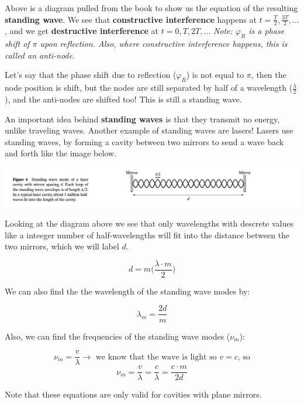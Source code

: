 \documentclass[10pt]{article}
\begin{document}
Above is a diagram pulled from the book to show us the equation of the resulting \textbf{standing wave}. We see that \textbf{constructive interference} happens at $t = \frac{T}{2}, \frac{3T}{2}, \dots$, and we get \textbf{destructive interference} at $t = 0, T, 2T, \dots$ \textit{Note: $\varphi_R$ is a phase shift of $\pi$ upon reflection. Also, where constructive interference happens, this is called an anti-node.}

\newblock

Let's say that the phase shift due to reflection ($\varphi_R$) is not equal to $\pi$, then the node position is shift, but the nodes are still separated by half of a wavelength ($\frac{\lambda}{2}$), and the anti-nodes are shifted too! This is still a standing wave.

\newblock

An important idea behind \textbf{standing waves} is that they transmit no energy, unlike traveling waves. Another example of standing waves are lasers! Lasers use standing waves, by forming a cavity between two mirrors to send a wave back and forth like the image below.

\begin{center}
    \includegraphics*[scale = .75]{imgs/standing-wave-for-lazer.png}
\end{center}

Looking at the diagram above we see that only wavelengths with descrete values like a inteeger number of half-wavelengths will fit into the distance between the two mirrors, which we will label $d$.

\[d = m \bigg( \frac{\lambda\cdot m}{2} \bigg)\]

\newpage

We can also find the the wavelength of the standing wave modes by: 

\[\lambda_m = \frac{2d}{m}\]

Also, we can find the frequencies of the standing wave modes ($\nu_m$):

\[\nu_m = \frac{v}{\lambda} \to \text{ we know that the wave is light so $v = c$, so}\]
\[ \nu_m = \frac{v}{\lambda} = \frac{c}{\lambda} = \frac{c\cdot m}{2d}\]

Note that these equations are only valid for cavities with plane mirrors.
\end{document}
